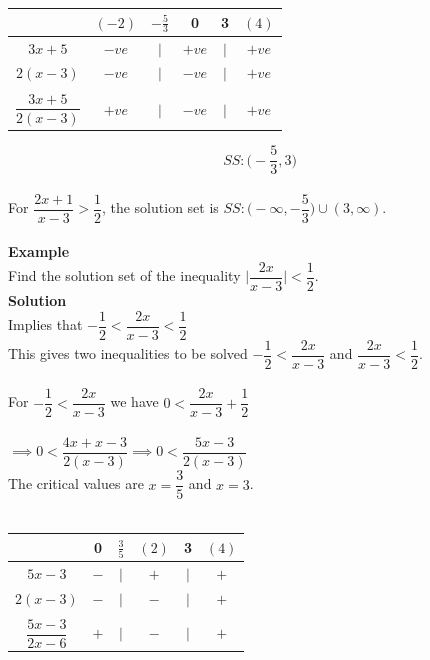 \documentclass[11pt,a4paper]{article}
\begin{document}
\begin{table}[H]
\centering
\begin{tabular}{cccccc}
& $(-2)$ & $-\frac{5}{3}$ & 0 & 3 & $(4)$\\
\hline
\multicolumn{1}{c|}{$3x+5$} & $-ve$ & $|$ & $+ve$ & $|$ & $+ve$\\
\multicolumn{1}{c|}{$2(x-3)$}  & $-ve$ & $|$ & $-ve$ & $|$ & $+ve$\\
\multicolumn{1}{c|}{}&&&&&\\
\multicolumn{1}{c|}{$\dfrac{3x+5}{2(x-3)}$} & $+ve$ & $|$ & $-ve$ & $|$ & $+ve$\\
\end{tabular}
\end{table}

$$SS:\bigg(-\frac{5}{3},3\bigg)$$\\

For $\dfrac{2x+1}{x-3}>\dfrac{1}{2}$, the solution set is $SS:\bigg(-\infty,-\dfrac{5}{3}\bigg)\cup (3,\infty)$.\\\\




\textbf{Example}\\
Find the solution set of the inequality $\bigg|\dfrac{2x}{x-3}\bigg|<\dfrac{1}{2}$.\\

\textbf{Solution}\\
Implies that $-\dfrac{1}{2}<\dfrac{2x}{x-3}<\dfrac{1}{2}$\\

This gives two inequalities to be solved $-\dfrac{1}{2}<\dfrac{2x}{x-3}$ and $\dfrac{2x}{x-3}<\dfrac{1}{2}$.\\\\

For $-\dfrac{1}{2}<\dfrac{2x}{x-3}$ we have $0<\dfrac{2x}{x-3}+\dfrac{1}{2}$\\\\

$\implies 0<\dfrac{4x+x-3}{2(x-3)}\implies 0<\dfrac{5x-3}{2(x-3)}$\\

The critical values are $x=\dfrac{3}{5}$ and $x=3$.\\\\



\begin{table}[H]
\centering
\begin{tabular}{cccccc}
& 0 & $\frac{3}{5}$ & $(2)$ & 3 & $(4)$\\
\hline
\multicolumn{1}{c|}{$5x-3$}  & $-$ & $|$ & $+$ & $|$ & $+$\\
\multicolumn{1}{c|}{$2(x-3)$} & $-$ & $|$ & $-$ & $|$ & $+$\\
\multicolumn{1}{c|}{}&&&&&\\
\multicolumn{1}{c|}{$\dfrac{5x-3}{2x-6}$} & $+$ & $|$ & $-$ & $|$& $+$\\
\end{tabular}
\end{table}
\end{document}
